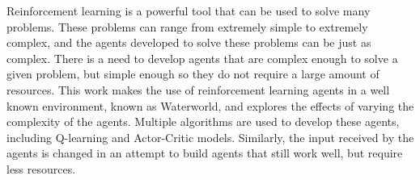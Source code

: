Reinforcement learning is a powerful tool that can be used to solve many problems.
These problems can range from extremely simple to extremely complex, and the agents
developed to solve these problems can be just as complex.
There is a need to develop agents that are complex enough to solve a given problem,
but simple enough so they do not require a large amount of resources.
This work makes the use of reinforcement learning agents in a well known
environment, known as Waterworld, and explores the effects of varying the complexity
of the agents.
Multiple algorithms are used to develop these agents, including Q-learning and
Actor-Critic models.
Similarly, the input received by the agents is changed in an attempt to build agents
that still work well, but require less resources.
